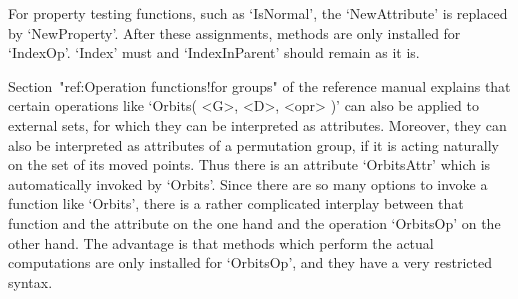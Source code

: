 For property testing functions, such as `IsNormal', the `NewAttribute' is
replaced  by  `NewProperty'. After  these assignments,  methods  are only
installed for `IndexOp'. `Index'  must and `IndexInParent'  should remain
as it is.


Section~"ref:Operation  functions!for  groups"  of  the  reference manual
explains that certain  operations like  `Orbits( <G>,  <D>, <opr> )'  can
also  be applied to external  sets, for which  they can be interpreted as
attributes. Moreover, they  can also be  interpreted  as attributes  of a
permutation group,  if it is  acting naturally  on the  set  of its moved
points. Thus  there is an  attribute  `OrbitsAttr' which is automatically
invoked by `Orbits'. Since there are so many options to invoke a function
like  `Orbits', there   is  a rather complicated   interplay between that
function and the attribute on  the one hand  and the operation `OrbitsOp'
on the other hand. The advantage is that methods which perform the actual
computations  are only installed  for  `OrbitsOp', and  they have  a very
restricted syntax.


